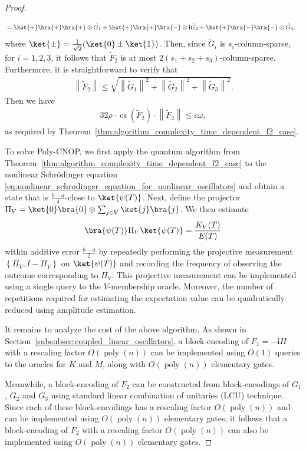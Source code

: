 \documentclass[superscriptaddress,onecolumn,nofootinbib,longbibliography,a4paper,accepted=2026-09-29]{quantumarticle}
\theoremstyle{plain}
\theoremstyle{definition}
\numberwithin{thm}{section}
\numberwithin{assumption}{section}
\numberwithin{lemma}{section}
\numberwithin{prop}{section}
\numberwithin{cor}{section}
\numberwithin{definition}{section}
\numberwithin{rmk}{section}
\numberwithin{equation}{section}
\newcommand{\norm}[1]     {\left\| #1 \right\|}
\newcommand{\lrb}[1]{\left ( #1 \right )}
\newcommand{\lrcb}[1]{\left \{ #1 \right \}}
\renewcommand{\i}{\ensuremath{\mathbf{i}}}
\newcommand{\mypoly}[1]{\operatorname{poly} \lrb{#1}}
\newcommand{\myO}[1]{O\lrb{#1}}
\begin{document}
\begin{proof}
\begin{itemize}
\begin{align}
& 
=\ket{+}\bra{+}\bra{+} \otimes \tilde{G}_1 +\ket{+}\bra{+}\bra{-} \otimes \i \tilde{G}_2 +\ket{+}\bra{-}\bra{-} \otimes \tilde{G}_3,
\end{align}
where $\ket{\pm}=\frac{1}{\sqrt{2}}(\ket{0} \pm \ket{1})$. Then,
since $\tilde{G}_i$ is $s_i$-column-sparse, for $i=1,2,3$, it follows that $\tilde{F}_2$ is at most $2(s_1+s_2+s_3)$-column-sparse. Furthermore, it is straightforward to verify that
\begin{align}
    \norm{\tilde{F}_2} \le \sqrt{\norm{\tilde{G}_1}^2+\norm{\tilde{G}_2}^2+\norm{\tilde{G}_3}^2}. 
\end{align}
Then we have
\begin{align}
    32 \rho \cdot \operatorname{cs}(\tilde{F}_2) \cdot \norm{\tilde{F}_2} \le c \omega,
\end{align}
as required by Theorem~\ref{thm:algorithm_complexity_time_dependent_f2_case}.
\end{itemize}

To solve Poly-CNOP, we first apply the quantum algorithm from Theorem~\ref{thm:algorithm_complexity_time_dependent_f2_case} to the nonlinear Schr\"{o}dinger equation \eqref{eq:nonlinear_schrodinger_equation_for_nonlinear_oscillators} and obtain a state that is $\frac{b-a}{4}$-close to $\ket{\psi(T)}$. Next, define the projector $\Pi_V= \ket{0}\bra{0}\otimes \sum_{j \in V} \ket{j}\bra{j}$. We then estimate
\begin{align}
   \bra{\psi(T)} \Pi_V \ket{\psi(T)} = \frac{K_V(T)}{E(T)}
\end{align}
within additive error $\frac{b-a}{2}$ by repeatedly performing the projective measurement
$\lrcb{\Pi_V, I-\Pi_V}$ on $\ket{\psi(T)}$ and recording the frequency of observing the outcome corresponding to $\Pi_V$. This projective measurement can be implemented using a single query to the $V$-membership oracle. Moreover, the number of repetitions required for estimating the expectation value can be quadratically reduced using amplitude estimation.

It remains to analyze the cost of the above algorithm. As shown in Section~\ref{subsubsec:coupled_linear_oscillators}, a block-encoding of $F_1=-\i H$ with a rescaling factor $\myO{\mypoly{n}}$ can be implemented using $\myO{1}$ queries to the oracles for $K$ and $M$, along with $\myO{\mypoly{n}}$ elementary gates. 

Meanwhile, a block-encoding of $F_2$ can be constructed from block-encodings of $G_1$, $G_2$ and $G_3$ using standard linear combination of unitaries (LCU) technique. Since each of these block-encodings has a rescaling factor $\myO{\mypoly{n}}$ and can be implemented using $\myO{\mypoly{n}}$ elementary gates, it follows that 
a block-encoding of $F_2$ with a rescaling factor $\myO{\mypoly{n}}$ can also be implemented using $\myO{\mypoly{n}}$ elementary gates. 


\end{proof}
\end{document}
